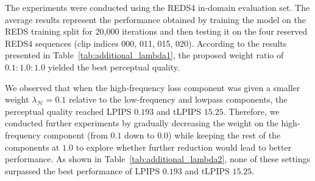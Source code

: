 The experiments were conducted using the REDS4 in-domain 
evaluation set. The average results represent the performance 
obtained by training the model on the REDS training split for 
20{,}000 iterations and then testing it on the four reserved 
REDS4 sequences (clip indices 000, 011, 015, 020). According 
to the results presented in 
Table~\ref{tab:additional_lambda1}, the proposed weight ratio 
of $0.1{:}1.0{:}1.0$ yielded the best perceptual quality.

\begin{table}[t]
\caption{The comparison of perceptual quality on REDS4 in 
different weights on individual loss components.}
\centering
{}
\label{tab:additional_lambda1}
\end{table}

We observed that when the high-frequency loss component was 
given a smaller weight $\lambda_{\mathcal{H}} = 0.1$ relative 
to the low-frequency and lowpass components, the perceptual 
quality reached LPIPS $0.193$ and tLPIPS $15.25$. Therefore, 
we conducted further experiments by gradually decreasing the 
weight on the high-frequency component (from $0.1$ down to 
$0.0$) while keeping the rest of the components at $1.0$ to 
explore whether further reduction would lead to better 
performance. As shown in Table~\ref{tab:additional_lambda2}, 
none of these settings surpassed the best performance of 
LPIPS $0.193$ and tLPIPS $15.25$.

